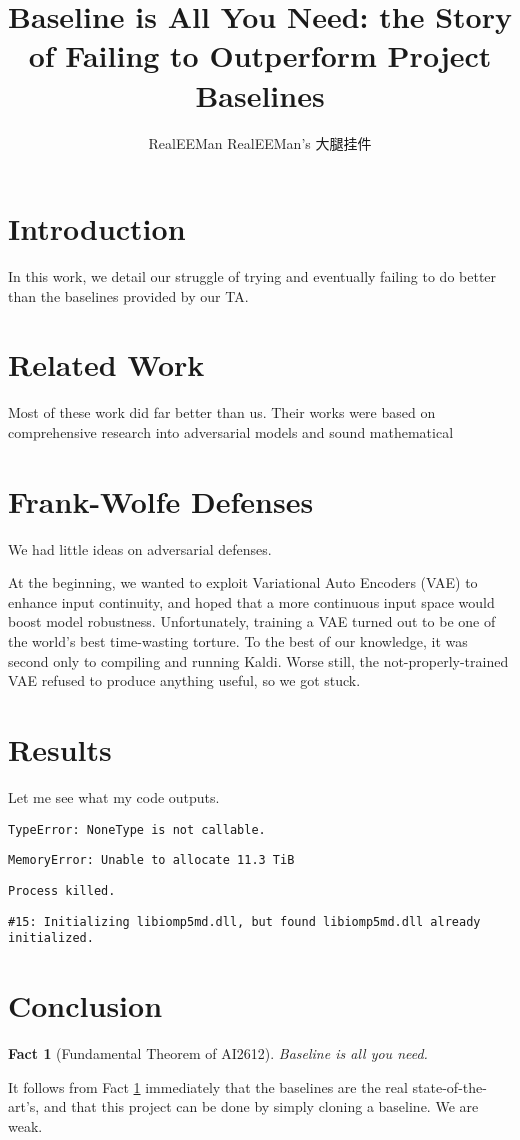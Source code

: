 \documentclass{article}
\title{Baseline is All You Need: the Story of Failing to Outperform Project Baselines}
\author{RealEEMan \quad RealEEMan's 大腿挂件}
\date{}
\newtheorem{fact}{Fact}
\begin{document}
\maketitle
\section{Introduction}\label{Sec:Intro}
In this work, we detail our struggle of trying and eventually failing to do better than the baselines provided by our TA.

\section{Related Work}\label{Sec:RelatedWork}
Most of these work did far better than us. Their works were based on comprehensive research into adversarial models and sound mathematical 

\section{Frank-Wolfe Defenses}\label{Sec:DefenseMethodology}
We had little ideas on adversarial defenses.

At the beginning, we wanted to exploit Variational Auto Encoders (VAE) to enhance input continuity, and hoped that a more continuous input space would boost model robustness. Unfortunately, training a VAE turned out to be one of the world's best time-wasting torture. To the best of our knowledge, it was second only to compiling and running Kaldi. Worse still, the not-properly-trained VAE refused to produce anything useful, so we got stuck.

\section{Results}\label{Sec:Results}
Let me see what my code outputs.

\verb|TypeError: NoneType is not callable.|

\verb|MemoryError: Unable to allocate 11.3 TiB|

\verb|Process killed.|

\verb|#15: Initializing libiomp5md.dll, but found libiomp5md.dll already initialized.|

\section{Conclusion}\label{Sec:Conclusion}
\begin{fact}[Fundamental Theorem of AI2612]
    \label{Fact:FundamentalFactOfAI2612}
    Baseline is all you need.
\end{fact}
It follows from Fact \ref{Fact:FundamentalFactOfAI2612} immediately that the baselines are the real state-of-the-art's, and that this project can be done by simply cloning a baseline. We are weak.
\end{document}
